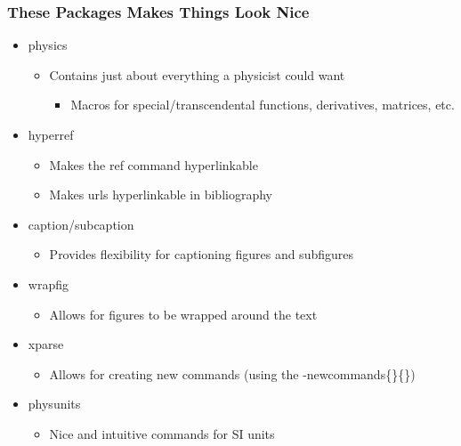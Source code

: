 \documentclass[fleqn, 11pt]{beamer}
\begin{document}
\begin{frame}
	\frametitle{These Packages Makes Things Look Nice}
	
	\begin{itemize}
		\item<1-> physics
		\begin{itemize}
			\item<2-> Contains just about everything a physicist could want
			\begin{itemize}
				\item<2-> Macros for special/transcendental functions, derivatives, matrices, etc.
			\end{itemize}
		\end{itemize}
		
		\item<1-> hyperref
		\begin{itemize}
			\item<3-> Makes the ref command hyperlinkable
			\item<4-> Makes urls hyperlinkable in bibliography
		\end{itemize}
		
		\item<1-> caption/subcaption
		\begin{itemize}
			\item<5-> Provides flexibility for captioning figures and subfigures
		\end{itemize}
		
		\item<1-> wrapfig
		\begin{itemize}
			\item<6-> Allows for figures to be wrapped around the text
		\end{itemize}
		
		\item<1-> xparse
		\begin{itemize}
			\item<7-> Allows for creating new commands (using the -newcommands\{\}\{\})
		\end{itemize}
		
		\item<1-> physunits
		\begin{itemize}
			\item<8-> Nice and intuitive commands for SI units
		\end{itemize}
	\end{itemize}
\end{frame}
\end{document}
